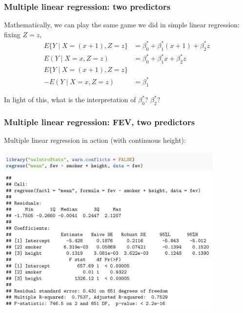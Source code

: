 \documentclass[12pt, 
hyperref={colorlinks=true, linkcolor=blue, urlcolor=cyan}]{beamer}
\begin{document}
\begin{frame}
\frametitle{Multiple linear regression: two predictors}

Mathematically, we can play the same game we did in simple linear regression: fixing $Z = z$, 
\begin{align*}
E\{Y \mid X = (x + 1), Z = z\} &= \beta_0^* + \beta_1^* (x + 1) + \beta_2^* z \\
E(Y \mid X = x, Z = z) &= \beta_0^* + \beta_1^* x + \beta_2^* z \\
E\{Y \mid X = (x + 1), Z = z\} & \\
- E(Y \mid X = x, Z = z) &= \beta_1^*
\end{align*}

In light of this, what is the interpretation of $\beta_0^*$? $\beta_2^*$? \vspace{2cm}
\end{frame}

\begin{frame}
\frametitle{Multiple linear regression: FEV, two predictors}
Multiple linear regression in action (with continuous height): \vspace{-0.45cm}
\begin{center}
\includegraphics[width = 0.85\textwidth]{plots/fev_vs_smoke_adjust_height.png}
\end{center}
\end{frame}
\end{document}
